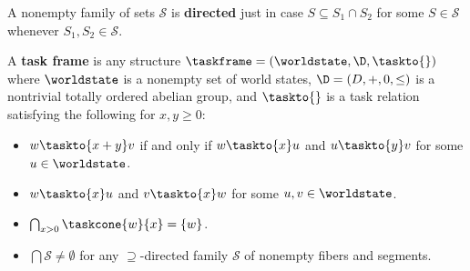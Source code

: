 \documentclass[../BimodalReference.tex]{subfiles}
\begin{document}
\begin{definition}\label{def:directed}
A nonempty family of sets $\mathcal{S}$ is \textbf{directed} just in case $S \subseteq S_1 \cap S_2$ for some $S \in \mathcal{S}$ whenever $S_1, S_2 \in \mathcal{S}$.
\end{definition}

\begin{definition}\label{def:frame}
A \textbf{task frame} is any structure $\taskframe = (\worldstate, \D, {\taskto{}})$ where $\worldstate$ is a nonempty set of world states, $\D = (D, +, 0, \leq)$ is a nontrivial totally ordered abelian group, and ${\taskto{}}$ is a task relation satisfying the following for $x, y \geq 0$:
\begin{itemize}
  \item[\emph{Compositionality}:] $w \taskto{x+y} v$ if and only if $w \taskto{x} u$ and $u \taskto{y} v$ for some $u \in \worldstate$.
  \item[\emph{Seriality}:] $w \taskto{x} u$ and $v \taskto{x} w$ for some $u, v \in \worldstate$.
  \item[\emph{Limit}:] $\bigcap_{x > 0} \taskcone{w}{x} = \{w\}$.
  \item[\emph{Saturation}:] $\bigcap \mathcal{S} \neq \emptyset$ for any $\supseteq$-directed family $\mathcal{S}$ of nonempty fibers and segments.
\end{itemize}
\end{definition}
\end{document}
